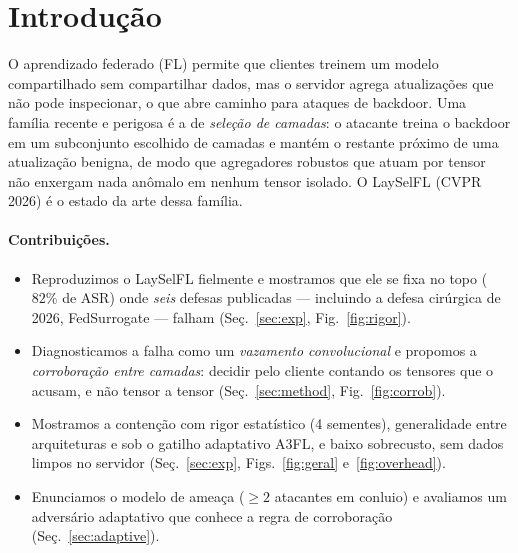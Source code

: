 \section{Introdução}
O aprendizado federado (FL) permite que clientes treinem um modelo compartilhado sem
compartilhar dados, mas o servidor agrega atualizações que não pode inspecionar, o que abre
caminho para ataques de backdoor. Uma família recente e perigosa é a de \emph{seleção de
camadas}: o atacante treina o backdoor em um subconjunto escolhido de camadas e mantém o
restante próximo de uma atualização benigna, de modo que agregadores robustos que atuam por
tensor não enxergam nada anômalo em nenhum tensor isolado. O LaySelFL (CVPR 2026) \cite{laysel}
é o estado da arte dessa família.

\paragraph{Contribuições.}
\begin{itemize}
  \item Reproduzimos o LaySelFL fielmente e mostramos que ele se fixa no topo ($82\%$ de ASR)
  onde \emph{seis} defesas publicadas --- incluindo a defesa cirúrgica de 2026, FedSurrogate ---
  falham (Seç.~\ref{sec:exp}, Fig.~\ref{fig:rigor}).
  \item Diagnosticamos a falha como um \emph{vazamento convolucional} e propomos a
  \emph{corroboração entre camadas}: decidir pelo cliente contando os tensores que o acusam,
  e não tensor a tensor (Seç.~\ref{sec:method}, Fig.~\ref{fig:corrob}).
  \item Mostramos a contenção com rigor estatístico (4 sementes), generalidade entre
  arquiteturas e sob o gatilho adaptativo A3FL, e baixo sobrecusto, sem dados limpos no
  servidor (Seç.~\ref{sec:exp}, Figs.~\ref{fig:geral} e~\ref{fig:overhead}).
  \item Enunciamos o modelo de ameaça ($\geq 2$ atacantes em conluio) e avaliamos um adversário
  adaptativo que conhece a regra de corroboração (Seç.~\ref{sec:adaptive}).
\end{itemize}
